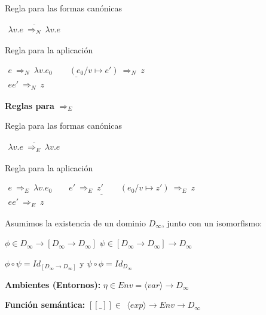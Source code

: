 \documentclass[handout]{beamer}
\newcommand{\se}[1]{\mbox{$[\![#1]\!]$}}
\begin{document}
Regla para las formas canónicas

$\begin{array}{c}
\overline{\lambda v.e\ \Rightarrow_N\ \lambda v.e}
\end{array}
$

\smallskip

Regla para la aplicación

\smallskip

$\begin{array}{c}
\underline{e\ \Rightarrow_N\ \lambda v.e_0\qquad (e_0/v\mapsto e')\ \Rightarrow_N\ z}\\
ee'\ \Rightarrow_N\ z
\end{array}
$

\smallskip

\textbf{Reglas para} $\Rightarrow_E$

Regla para las formas canónicas

$\begin{array}{c}
\overline{\lambda v.e\ \Rightarrow_E\ \lambda v.e}
\end{array}
$

\smallskip

Regla para la aplicación

\smallskip

$\begin{array}{c}
\underline{e\ \Rightarrow_E\ \lambda v.e_0\qquad e'\ \Rightarrow_E\ z'\qquad(e_0/v\mapsto z')\ \Rightarrow_E\ z}\\
ee'\ \Rightarrow_E\ z
\end{array}
$

\clearpage


Asumimos la existencia de un dominio $D_{\infty}$, junto con un
isomorfismo:

$\phi\in D_{\infty}\rightarrow [D_{\infty}\rightarrow D_{\infty}]$
\quad $\psi\in [D_{\infty}\rightarrow D_{\infty}]\rightarrow D_{\infty}$

\smallskip
$\phi \circ \psi = Id_{[D_{\infty}\rightarrow D_{\infty}]}$
y $\psi\circ\phi = Id_{D_{\infty}}$

\medskip

\textbf{Ambientes (Entornos):} $\eta \in Env = \langle var\rangle\rightarrow D_\infty $

\smallskip

\textbf{Función semántica:} $\se{\_}\in\ \ \langle exp\rangle \rightarrow Env\rightarrow D_{\infty}$
\end{document}
